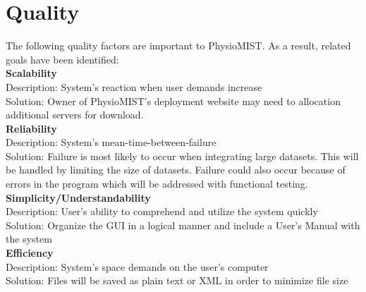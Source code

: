 \documentclass{article}
\begin{document}
\section{Quality}
The following quality factors are important to PhysioMIST.  As a result, related goals have been identified:\\
\textbf{Scalability}\\
Description:  System's reaction when user demands increase\\
Solution:  Owner of PhysioMIST's deployment website may need to allocation additional servers for download.\\
\textbf{Reliability}\\
Description:  System's mean-time-between-failure\\
Solution: Failure is most likely to occur when integrating large datasets.  This will be handled by limiting the size of datasets.  Failure could also occur because of errors in the program which will be addressed with functional testing.\\
\textbf{Simplicity/Understandability}\\
Description: User's ability to comprehend and utilize the system quickly\\
Solution: Organize the GUI in a logical manner and include a User's Manual with the system\\
\textbf{Efficiency}\\
Description: System's space demands on the user's computer\\
Solution: Files will be saved as plain text or XML in order to minimize file size
\end{document}
